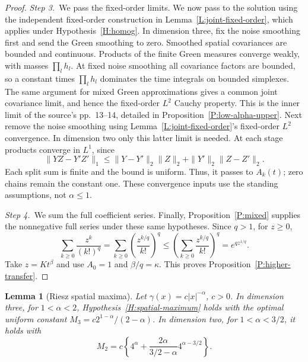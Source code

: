 \documentclass[12pt,oneside,openany]{book}
\makeatletter
\let\lean@pending\@empty
\newcommand{\LeanMarker}[1]{\gdef\lean@pending{#1}}
\numberwithin{equation}{section}
\newtheorem{lemma}[theorem]{Lemma}
\theoremstyle{nogostyle}
\theoremstyle{definition}
\makeatother
\begin{document}
\begin{proof}
  \medskip
  \noindent\textit{Step 3.~}We pass the fixed-order limits.
  We now pass to the solution using the independent fixed-order construction in
  Lemma~\ref{L:joint-fixed-order}, which applies under Hypothesis~\ref{H:homog}.
  In dimension three, fix the noise smoothing first and send the Green smoothing
  to zero. Smoothed spatial covariances are bounded and continuous. Products of
  the finite Green measures converge weakly, with masses $\prod_lh_l$. At fixed
  noise smoothing all covariance factors are bounded, so a constant times
  $\prod_lh_l$ dominates the time integrals on bounded simplexes. The same
  argument for mixed Green approximations gives a common joint covariance limit,
  and hence the fixed-order $L^2$ Cauchy property. This is the inner limit of
  the source's pp.~13--14, detailed in Proposition~\ref{P:low-alpha-upper}. Next
  remove the noise smoothing using Lemma~\ref{L:joint-fixed-order}'s fixed-order
  $L^2$ convergence. In dimension two only this latter limit is needed. At each
  stage products converge in $L^1$, since
  \[
    \|YZ-Y'Z'\|_1
    \le\|Y-Y'\|_2\|Z\|_2+\|Y'\|_2\|Z-Z'\|_2.
  \]
  Each split sum is finite and the bound is uniform. Thus, it passes to
  $A_k(t)$; zero chains remain the constant one. These convergence inputs use
  the standing assumptions, not $\alpha \le 1$.


  \medskip
  \noindent\textit{Step 4.~}We sum the full coefficient series.
  Finally, Proposition~\ref{P:mixed} supplies the nonnegative full series under
  these same hypotheses. Since $q > 1$, for $z \ge 0$,
  \[
    \sum_{k\ge0}\frac{z^k}{(k!)^q}
    =\sum_{k\ge0}\left(\frac{z^{k/q}}{k!}\right)^q
    \le\left(\sum_{k\ge0}\frac{z^{k/q}}{k!}\right)^q
    =e^{qz^{1/q}}.
  \]
  Take $z = Kt^\beta$ and use $A_0 = 1$ and $\beta/q = \kappa$. This proves
  Proposition~\ref{P:higher-transfer}.
\end{proof}

\LeanMarker{L:higher-riesz}
\begin{lemma}[Riesz spatial maxima]\label{L:higher-riesz}
  Let $\gamma(x) = c|x|^{-\alpha}$, $c > 0$. In dimension three, for $1 < \alpha
  < 2$, Hypothesis~\ref{H:spatial-maximum} holds with the optimal uniform
  constant $M_3 = c2^{1-\alpha}/(2-\alpha)$. In dimension two, for $1 < \alpha <
  3/2$, it holds with
  \[
    M_2=c\left\{4^\alpha+
    \frac{2\alpha}{3/2-\alpha}4^{\alpha-3/2}\right\}.
  \]
\end{lemma}
\end{document}
